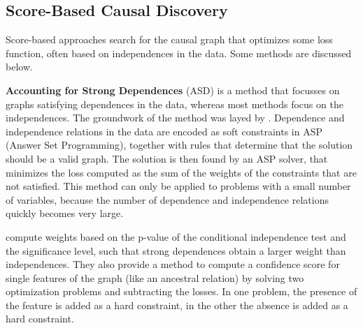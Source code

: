 

    
\subsection*{Score-Based Causal Discovery}
Score-based approaches search for the causal graph that optimizes some loss function, often based on independences in the data. Some methods are discussed below.

\textbf{Accounting for Strong Dependences} (ASD) is a method that focusses on graphs satisfying dependences in the data, whereas most methods focus on the independences. The groundwork of the method was layed by \citet{hyttinen2014constraint}. Dependence and independence relations in the data are encoded as soft constraints in ASP (Answer Set Programming), together with rules that determine that the solution should be a valid graph. The solution is then found by an ASP solver, that minimizes the loss computed as the sum of the weights of the constraints that are not satisfied. This method can only be applied to problems with a small number of variables, because the number of dependence and independence relations quickly becomes very large.

\citet{magliacane2016ancestral} compute weights based on the p-value of the conditional independence test and the significance level, such that strong dependences obtain a larger weight than independences. They also provide a method to compute a confidence score for single features of the graph (like an ancestral relation) by solving two optimization problems and subtracting the losses. In one problem, the presence of the feature is added as a hard constraint, in the other the absence is added as a hard constraint. 

